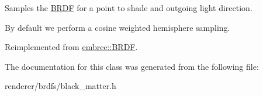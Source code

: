 Samples the \hyperlink{classembree_1_1_b_r_d_f}{BRDF} for a point to shade and outgoing light direction. 

By default we perform a cosine weighted hemisphere sampling. 

Reimplemented from \hyperlink{classembree_1_1_b_r_d_f_a6eb1a114a4f36dc2c1ad65bcbce5f809}{embree::BRDF}.



The documentation for this class was generated from the following file:\begin{DoxyCompactItemize}
\item 
renderer/brdfs/black\_\-matter.h\end{DoxyCompactItemize}
